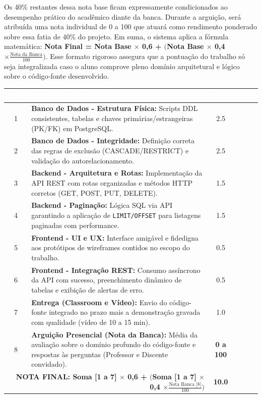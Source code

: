 \documentclass[12pt,a4paper]{article}
\begin{document}
Os 40\% restantes dessa nota base ficam expressamente condicionados ao desempenho prático do acadêmico diante da banca. Durante a arguição, será atribuída uma nota individual de 0 a 100 que atuará como rendimento ponderado sobre essa fatia de 40\% do projeto. Em suma, o sistema aplica a fórmula matemática: \textbf{Nota Final = Nota Base $\times$ 0,6 + $\Big($Nota Base $\times$ 0,4 $\times \frac{\text{Nota da Banca}}{100}\Big)$}. Esse formato rigoroso assegura que a pontuação do trabalho só seja integralizada caso o aluno comprove pleno domínio arquitetural e lógico sobre o código-fonte desenvolvido.
\vspace{0.5cm}

\begin{center}
    
    \renewcommand{\arraystretch}{1.5}
    \begin{tabularx}{\textwidth}{|c|X|c|c|}
        \hline
        \rowcolor{forestgreen}\textcolor{white}{\textbf{Item}} & \textcolor{white}{\textbf{Critério de Avaliação}} & \textcolor{white}{\textbf{Peso}} & \textcolor{white}{\textbf{Nota}} \\
        \hline
        1 & \textbf{Banco de Dados - Estrutura Física:} Scripts DDL consistentes, tabelas e chaves primárias/estrangeiras (PK/FK) em PostgreSQL. & 2.5 & \\
        \hline
        2 & \textbf{Banco de Dados - Integridade:} Definição correta das regras de exclusão (CASCADE/RESTRICT) e validação do autorelacionamento. & 2.5 & \\
        \hline
        3 & \textbf{Backend - Arquitetura e Rotas:} Implementação da API REST com rotas organizadas e métodos HTTP corretos (GET, POST, PUT, DELETE). & 1.5 & \\
        \hline
        4 & \textbf{Backend - Paginação:} Lógica SQL via API garantindo a aplicação de \texttt{LIMIT/OFFSET} para listagens paginadas com performance. & 1.5 & \\
        \hline
        5 & \textbf{Frontend - UI e UX:} Interface amigável e fidedigna aos protótipos de wireframes contidos no escopo do trabalho. & 0.5 & \\
        \hline
        6 & \textbf{Frontend - Integração REST:} Consumo assíncrono da API com sucesso, preenchimento dinâmico de tabelas e exibição de alertas de erro. & 0.5 & \\
        \hline
        7 & \textbf{Entrega (Classroom e Vídeo):} Envio do código-fonte integrado no prazo mais a demonstração gravada com qualidade (vídeo de 10 a 15 min). & 1.0 & \\
        \hline
        \rowcolor{gray!10}
        8 & \textbf{Arguição Presencial (Nota da Banca):} Média da avaliação sobre o domínio profundo do código-fonte e respostas às perguntas (Professor e Discente convidado). & \textbf{0 a 100} & \\
        \hline
        \multicolumn{2}{|r|}{\textbf{NOTA FINAL: Soma [1 a 7] $\times$ 0,6 + $\Big($Soma [1 a 7] $\times$ 0,4 $\times \frac{\text{Nota Banca [8]}}{100}\Big)$}} & \textbf{10.0} & \\
        \hline
    \end{tabularx}
\end{center}
\end{document}
